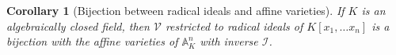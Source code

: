 \documentclass[12pt, a4paper]{article}
\newtheorem{corollary}[theorem]{Corollary}
\theoremstyle{definition}
\begin{document}
\begin{corollary}[Bijection between radical ideals and affine varieties]
	If $K$ is an algebraically closed field, then $\mathcal V$ restricted to radical ideals of $K[x_1, \dots x_n]$ is a bijection with the affine varieties of $\mathbb{A}_K^n$ with inverse $\mathcal I$.
\end{corollary}




\end{document}
